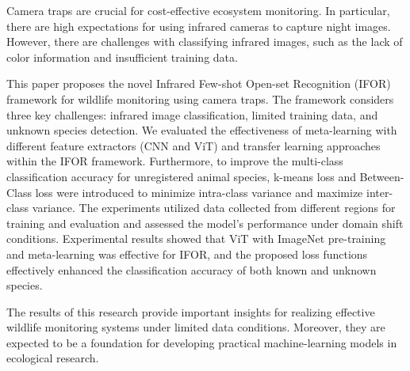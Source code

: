 
Camera traps are crucial for cost-effective ecosystem monitoring.
In particular, there are high expectations for using infrared cameras to capture night images.
However, there are challenges with classifying infrared images, such as the lack of color information and insufficient training data.

This paper proposes the novel Infrared Few-shot Open-set Recognition (IFOR) framework for wildlife monitoring using camera traps.
The framework considers three key challenges: infrared image classification, limited training data, and unknown species detection.
We evaluated the effectiveness of meta-learning with different feature extractors (CNN and ViT) and transfer learning approaches within the IFOR framework.
Furthermore, to improve the multi-class classification accuracy for unregistered animal species, 
k-means loss and Between-Class loss were introduced to minimize intra-class variance and maximize inter-class variance.
The experiments utilized data collected from different regions for training and evaluation and assessed the model's performance under domain shift conditions.
Experimental results showed that ViT with ImageNet pre-training and meta-learning was effective for IFOR, 
and the proposed loss functions effectively enhanced the classification accuracy of both known and unknown species.

The results of this research provide important insights for realizing effective wildlife monitoring systems under limited data conditions.
Moreover, they are expected to be a foundation for developing practical machine-learning models in ecological research.